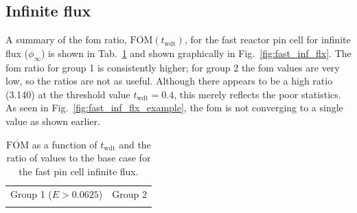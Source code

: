 \subsection{Infinite flux}
\label{sec:fast_inf_flx}
A summary of the \gls{fom} ratio,
$\overline{\mathrm{FOM}}(t_{\mathrm{wdt}})$, for the fast reactor pin
cell for infinite flux ($\phi_{\infty}$) is shown in Tab.~\ref{tab:fast_inf_flx} and
shown graphically in Fig.~\ref{fig:fast_inf_flx}. The \gls{fom} ratio
for group 1 is consistently higher; for group 2 the \gls{fom} values are
very low, so the ratios are not as useful. 
Although there appears to
be a high ratio (3.140) at the threshold value $t_{\mathrm{wdt}}
=0.4$, this merely reflects the poor statistics. As seen in
Fig.~\ref{fig:fast_inf_flx_example}, the \gls{fom} is not converging
to a single value as shown earlier.
\begin{table}[hbtp]
  \centering
  \caption[$\overline{\mathrm{FOM}}$ and ratio for
    the fast pin cell infinite flux.]{$\overline{\mathrm{FOM}}$ as a function of
    $t_{\mathrm{wdt}}$ and the ratio of values to the base case for
    the fast pin cell infinite flux.}
  \begin{tabular}{cc} Group 1 ($E > 0.0625$) & Group 2 \\
    
 &
   
  \end{tabular}
\label{tab:fast_inf_flx}
\end{table}
